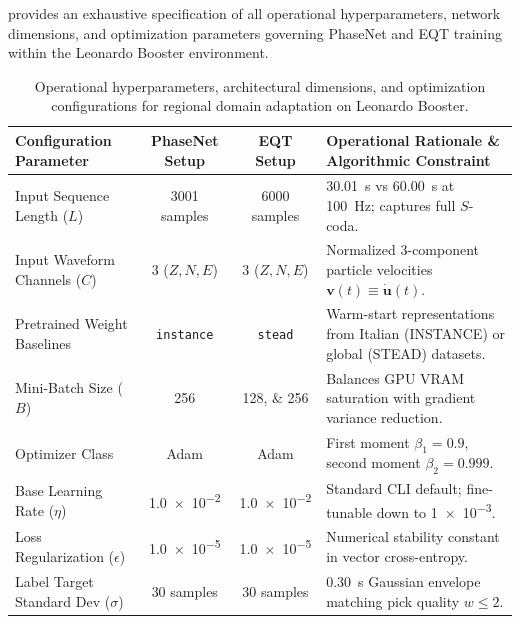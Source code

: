  provides an exhaustive specification
of all operational hyperparameters, network dimensions, and
optimization parameters
governing \ac{PhaseNet} and \ac{EQT} training within the Leonardo
Booster environment.

\begin{table}[htbp]
  \centering
  \small
  \caption{Operational hyperparameters, architectural dimensions,
    and optimization
  configurations for regional domain adaptation on Leonardo Booster.}
  \label{tab:training_hyperparameters}
  \begin{threeparttable}
    \begin{tabularx}{\linewidth}{l c c >{\raggedright\arraybackslash}X}
      \toprule
      \textbf{Configuration Parameter} & \textbf{\ac{PhaseNet} Setup} &
      \textbf{\ac{EQT} Setup} & \textbf{Operational Rationale
      \& Algorithmic Constraint} \\
      \midrule
      Input Sequence Length ($L$) & \num{3001} samples & \num{6000}
      samples & \qty{30.01}{\second} vs \qty{60.00}{\second}
      at \qty{100}{\hertz}; captures full $S$-coda. \\
      Input Waveform Channels ($C$)& \num{3} ($Z, N, E$)   & \num{3} ($Z, N,
      E$)   & Normalized 3-component particle velocities
      $\mathbf{v}(t) \equiv \dot{\mathbf{u}}(t)$. \\
      Pretrained Weight Baselines & \texttt{instance} &
      \texttt{stead}     & Warm-start representations from Italian
      (\ac{INSTANCE}) or global (\ac{STEAD}) datasets. \\
      Mini-Batch Size ($B$)       & \num{256}             & \numlist{128; 256}
      & Balances \ac{GPU} VRAM saturation with gradient
      variance reduction. \\
      Optimizer Class             & Adam              & Adam
      & First moment $\beta_1 = \num{0.9}$, second moment $\beta_2 =
      \num{0.999}$. \\
      Base Learning Rate ($\eta$) & \num{1.0e-2} & \num{1.0e-2}
      & Standard CLI default; fine-tunable down to \num{1e-3}. \\
      Loss Regularization ($\epsilon$) & \num{1.0e-5} & \num{1.0e-5}
      & Numerical stability constant in vector
      cross-entropy. \\
      Label Target Standard Dev ($\sigma$) & \num{30} samples & \num{30}
      samples & \qty{0.30}{\second} Gaussian envelope matching
      pick quality $w \le \num{2}$. \\

\end{tabularx}
\end{threeparttable}
\end{table}
